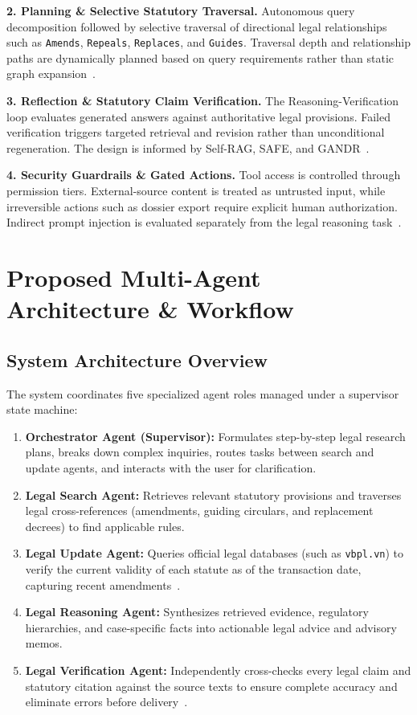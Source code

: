 \documentclass[10pt,a4paper]{article}
\begin{document}
\textbf{2. Planning \& Selective Statutory Traversal.}
Autonomous query decomposition followed by selective traversal of directional legal relationships such as \texttt{Amends}, \texttt{Repeals}, \texttt{Replaces}, and \texttt{Guides}. Traversal depth and relationship paths are dynamically planned based on query requirements rather than static graph expansion~\cite{phan2026sbvlawgraph}.

\textbf{3. Reflection \& Statutory Claim Verification.}
The Reasoning-Verification loop evaluates generated answers against authoritative legal provisions. Failed verification triggers targeted retrieval and revision rather than unconditional regeneration. The design is informed by Self-RAG, SAFE, and GANDR~\cite{asai2024selfrag,wei2024safe,qian2026gandr}.

\textbf{4. Security Guardrails \& Gated Actions.}
Tool access is controlled through permission tiers. External-source content is treated as untrusted input, while irreversible actions such as dossier export require explicit human authorization. Indirect prompt injection is evaluated separately from the legal reasoning task~\cite{debenedetti2024injection}.

\section{Proposed Multi-Agent Architecture \& Workflow}

\subsection{System Architecture Overview}
The system coordinates five specialized agent roles managed under a supervisor state machine:
\begin{enumerate}
  \item \textbf{Orchestrator Agent (Supervisor):} Formulates step-by-step legal research plans, breaks down complex inquiries, routes tasks between search and update agents, and interacts with the user for clarification.
  \item \textbf{Legal Search Agent:} Retrieves relevant statutory provisions and traverses legal cross-references (amendments, guiding circulars, and replacement decrees) to find applicable rules.
  \item \textbf{Legal Update Agent:} Queries official legal databases (such as \texttt{vbpl.vn}) to verify the current validity of each statute as of the transaction date, capturing recent amendments~\cite{fan2026timetravel}.
  \item \textbf{Legal Reasoning Agent:} Synthesizes retrieved evidence, regulatory hierarchies, and case-specific facts into actionable legal advice and advisory memos.
  \item \textbf{Legal Verification Agent:} Independently cross-checks every legal claim and statutory citation against the source texts to ensure complete accuracy and eliminate errors before delivery~\cite{qian2026gandr,wei2024safe}.
\end{enumerate}
\end{document}
